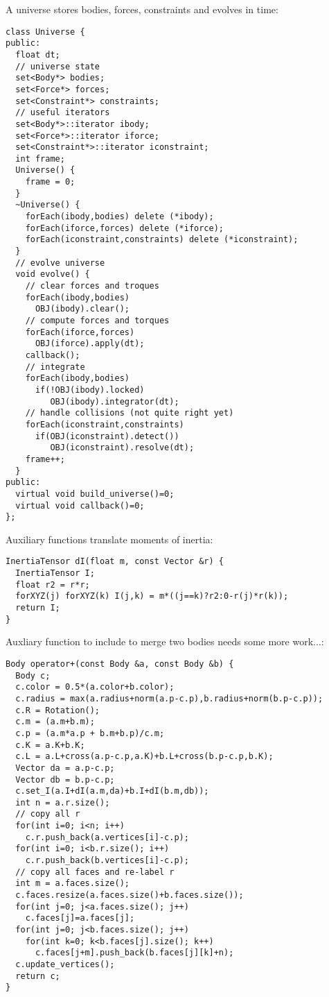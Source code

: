 \noindent
A universe stores bodies, forces, constraints
and evolves in time: \begin{lstlisting}
class Universe {
public:
  float dt;
  // universe state
  set<Body*> bodies;
  set<Force*> forces;
  set<Constraint*> constraints;
  // useful iterators
  set<Body*>::iterator ibody;
  set<Force*>::iterator iforce;
  set<Constraint*>::iterator iconstraint;
  int frame;
  Universe() {
    frame = 0;
  }
  ~Universe() { 
    forEach(ibody,bodies) delete (*ibody);
    forEach(iforce,forces) delete (*iforce);
    forEach(iconstraint,constraints) delete (*iconstraint);
  }
  // evolve universe
  void evolve() {    
    // clear forces and troques
    forEach(ibody,bodies)
      OBJ(ibody).clear();
    // compute forces and torques
    forEach(iforce,forces)
      OBJ(iforce).apply(dt);
    callback();
    // integrate
    forEach(ibody,bodies)
      if(!OBJ(ibody).locked)
	     OBJ(ibody).integrator(dt);
    // handle collisions (not quite right yet)
    forEach(iconstraint,constraints)
      if(OBJ(iconstraint).detect())
	     OBJ(iconstraint).resolve(dt);
    frame++;
  }
public:
  virtual void build_universe()=0;
  virtual void callback()=0;
};
\end{lstlisting}
\noindent
Auxiliary functions translate moments of inertia: \begin{lstlisting}
InertiaTensor dI(float m, const Vector &r) {
  InertiaTensor I;
  float r2 = r*r;
  forXYZ(j) forXYZ(k) I(j,k) = m*((j==k)?r2:0-r(j)*r(k));
  return I;
}
\end{lstlisting}
\noindent
Auxliary function to include to merge two bodies
needs some more work...: \begin{lstlisting}
Body operator+(const Body &a, const Body &b) {
  Body c;
  c.color = 0.5*(a.color+b.color);
  c.radius = max(a.radius+norm(a.p-c.p),b.radius+norm(b.p-c.p));
  c.R = Rotation();
  c.m = (a.m+b.m);
  c.p = (a.m*a.p + b.m+b.p)/c.m;
  c.K = a.K+b.K;
  c.L = a.L+cross(a.p-c.p,a.K)+b.L+cross(b.p-c.p,b.K);
  Vector da = a.p-c.p;
  Vector db = b.p-c.p;
  c.set_I(a.I+dI(a.m,da)+b.I+dI(b.m,db));
  int n = a.r.size();
  // copy all r
  for(int i=0; i<n; i++)
    c.r.push_back(a.vertices[i]-c.p);
  for(int i=0; i<b.r.size(); i++)
    c.r.push_back(b.vertices[i]-c.p);
  // copy all faces and re-label r  
  int m = a.faces.size();
  c.faces.resize(a.faces.size()+b.faces.size());
  for(int j=0; j<a.faces.size(); j++)
    c.faces[j]=a.faces[j];
  for(int j=0; j<b.faces.size(); j++)
    for(int k=0; k<b.faces[j].size(); k++)
      c.faces[j+m].push_back(b.faces[j][k]+n);  
  c.update_vertices();
  return c;
}
\end{lstlisting}
